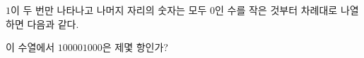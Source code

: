 $1$이 두 번만 나타나고 나머지 자리의 숫자는 모두 $0$인 수를 작은 것부터 차례대로 나열하면 다음과 같다.\par\smallskip{}\par\smallskip\noindent 이 수열에서 $100001000$은 제몇 항인가?
